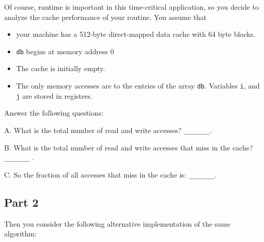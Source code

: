 Of course, runtime is important in this time-critical application,
so you decide to analyze the cache performance of your  routine.
You assume that
\begin{itemize}
\item your machine has a 512-byte direct-mapped data cache with 64 byte 
blocks. 
\item \verb|db| begins at memory address 0
\item The cache is initially empty.
\item The only memory accesses are to the entries of the array \verb|db|.
Variables \verb|i|, and  \verb|j| are stored in registers.
\end{itemize} 

\vspace{\baselineskip}
Answer the following questions:

A. What is the total number of read and write accesses? \verb|_______|. 


B. What is the total number of read and write accesses that 
miss in the cache? \verb|_______| .


C. So the fraction of all accesses that miss in the cache is: \verb|_______|.


\newpage

\subsection*{Part 2}
Then you consider the following alternative implementation of the
same algorithm:

